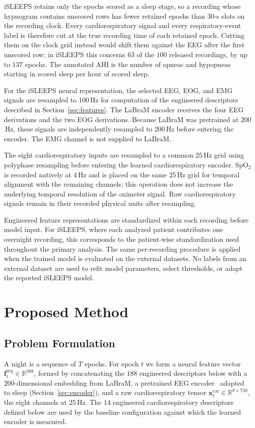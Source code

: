\documentclass{ieeeaccess}
\begin{document}
iSLEEPS retains only the epochs scored as a sleep stage, so a recording whose
hypnogram contains unscored rows has fewer retained epochs than $30$-s slots on
the recording clock. Every cardiorespiratory signal and every respiratory-event
label is therefore cut at the true recording time of each retained epoch. Cutting
them on the clock grid instead would shift them against the EEG after the first
unscored row; in iSLEEPS this concerns $63$ of the $100$ released recordings, by up
to $137$ epochs. The annotated AHI is the number of apneas and hypopneas starting
in scored sleep per hour of scored sleep.

For the iSLEEPS neural representation, the selected EEG, EOG, and EMG signals
are resampled to $100$\,Hz for computation of the engineered descriptors
described in Section~\ref{sec:features}. The LaBraM encoder receives the four
EEG derivations and the two EOG derivations. Because LaBraM was pretrained at
$200$\,Hz, these signals are independently resampled to $200$\,Hz before entering
the encoder. The EMG channel is not supplied to LaBraM.

The eight cardiorespiratory inputs are resampled to a common $25$\,Hz grid
using polyphase resampling before entering the learned cardiorespiratory
encoder. SpO$_2$ is recorded natively at $4$\,Hz and is placed on the same
$25$\,Hz grid for temporal alignment with the remaining channels; this
operation does not increase the underlying temporal resolution of the
oximeter signal. Raw cardiorespiratory signals remain in their recorded
physical units after resampling.

Engineered feature representations are standardized within each recording
before model input. For iSLEEPS, where each analyzed patient contributes one
overnight recording, this corresponds to the patient-wise standardization used
throughout the primary analysis. The same per-recording procedure is applied
when the trained model is evaluated on the external datasets. No labels from an
external dataset are used to refit model parameters, select thresholds, or
adapt the reported iSLEEPS model.

\section{Proposed Method}
\label{sec:method}
\subsection{Problem Formulation}
A night is a sequence of $T$ epochs. For epoch $t$ we form a neural feature vector
$\mathbf{f}^{\mathrm{eeg}}_t\in\mathbb{R}^{388}$, formed by concatenating the $188$
engineered descriptors below with a $200$-dimensional embedding from LaBraM, a
pretrained EEG encoder~\cite{labram2024} adapted to sleep (Section~\ref{sec:encoder}), and a raw cardiorespiratory tensor
$\mathbf{x}^{\mathrm{car}}_t\in\mathbb{R}^{8\times750}$, the eight channels at $25$\,Hz.
The $14$ engineered cardiorespiratory descriptors defined below are used by the baseline
configuration against which the learned encoder is measured.
\end{document}
